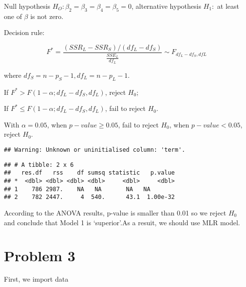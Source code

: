 \documentclass[]{article}
\newenvironment{Shaded}{\begin{snugshade}}{\end{snugshade}}
\newcommand{\KeywordTok}[1]{\textcolor[rgb]{0.13,0.29,0.53}{\textbf{#1}}}
\newcommand{\DataTypeTok}[1]{\textcolor[rgb]{0.13,0.29,0.53}{#1}}
\newcommand{\StringTok}[1]{\textcolor[rgb]{0.31,0.60,0.02}{#1}}
\newcommand{\OperatorTok}[1]{\textcolor[rgb]{0.81,0.36,0.00}{\textbf{#1}}}
\newcommand{\NormalTok}[1]{#1}
\begin{document}
Null hypothesis \(H_O: \beta_2 = \beta_3 = \beta_4 = \beta_5 = 0\),
alternative hypothesis \(H_1:\) at least one of \(\beta\) is not zero.

Decision rule:

\[ F^*=\frac{(SSR_L-SSR_S)/(df_L-df_S)}{\frac{SSE_L}{df_L}} \sim F_{df_L-df_S,dfL} \]

where \(df_S = n-p_S-1, df_L = n-p_L-1\).

If \(F^* > F(1-\alpha;df_L-df_S,df_L)\), reject \(H_0\);

If \(F^* \leq F(1-\alpha;df_L-df_S,df_L)\), fail to reject \(H_0\).

With \(\alpha = 0.05\), when \(p-value \geq 0.05\), fail to reject
\(H_0\), when \(p-value < 0.05\), reject \(H_0\).

\begin{Shaded}
\end{Shaded}

\begin{verbatim}
## Warning: Unknown or uninitialised column: 'term'.
\end{verbatim}

\begin{verbatim}
## # A tibble: 2 x 6
##   res.df   rss    df sumsq statistic   p.value
## *  <dbl> <dbl> <dbl> <dbl>     <dbl>     <dbl>
## 1    786 2987.    NA   NA       NA   NA       
## 2    782 2447.     4  540.      43.1  1.00e-32
\end{verbatim}

According to the ANOVA results, p-value is smaller than 0.01 so we
reject \(H_0\) and conclude that Model 1 is `superior'.As a resuit, we
should use MLR model.

\section{Problem 3}\label{problem-3}

First, we import data

\begin{Shaded}
\end{Shaded}
\end{document}
